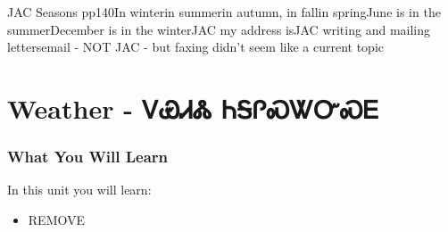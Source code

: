 \cite{walcpp49}\noindent JAC Seasons pp140In winterin summerin autumn, in fallin springJune is in the summerDecember is in the winterJAC my address isJAC writing and mailing lettersemail - NOT JAC - but faxing didn't seem like a current topic
\chapter{Weather - ᏙᏯᏗᏜ ᏂᎦᎵᏍᏔᏅᏍᎬ}
\subsection{What You Will Learn}
In this unit you will learn:
\begin{itemize}
\item REMOVE
\end{itemize}\newpage

